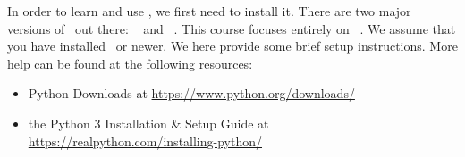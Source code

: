 %
\label{sec:installingPython}%
In order to learn and use \python, we first need to install it.
There are two major versions of \python\ out there: \python~ and \python~.
This course focuses entirely on \python~.
We assume that you have installed \pythonWithVersion\ or newer.
We here provide some brief setup instructions.
More help can be found at the following resources:%
%
\begin{itemize}%
\item Python Downloads at \url{https://www.python.org/downloads/}%
\item the Python 3 Installation \& Setup Guide at \url{https://realpython.com/installing-python/}%
\end{itemize}%
%
%
%
\afterpage{\clearpage}%
%
\endhsection%
%
